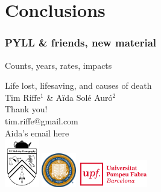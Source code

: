 \documentclass{beamer}
\begin{document}
\section{Conclusions}
\begin{frame}
\frametitle{PYLL \& friends, new material}

Counts, years, rates, impacts

\end{frame}



\begin{frame}[plain]

\vspace{3em}
\LARGE Life lost, lifesaving, and causes of death\\
\vspace{3 mm}
\normalsize Tim Riffe$^1$ \& A{\"i}da Sol\'{e} Aur\'{o}$^2$\\
\vspace{10 mm}
Thank you!\\
\vspace{3mm}
tim.riffe@gmail.com\\
Aida's email here \\ 
  \vspace{15 mm}
  \includegraphics[width=1.5cm]{Figures/demogcrest}\hspace{.5cm}
  \includegraphics[width=1.5cm]{Figures/ucbseal1}\hspace{3cm}
  \includegraphics[height=1.2cm]{Figures/UPFcmyk}
\end{frame}
\end{document}
